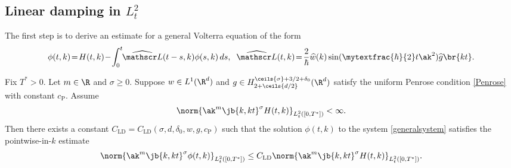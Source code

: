 \subsection{Linear damping in $L^2_t$} The first step is to derive an estimate for a general Volterra equation of the form
\begin{align}\label{generalsystem}
\phi(t,k)\!=\!H(t,k)\!-\!\int_0^t\hspace*{-1mm}\widehat {\mathscr L}(t-s,k)\phi(s,k)\,ds,\;\; \widehat {\mathscr L}(t,k)\!=\!\frac{2}{\hbar}\widehat w(k)\sin (\mytextfrac{\hbar}{2} t\ak^2)\widehat g\br{kt}.
\end{align}
\begin{proposition}\label{linearquantumdampingproposition}
Fix $T^*>0$.
Let $m\in\R$ and $\sigma\geq0$. Suppose $w\in L^1(\R^d)$ and $g\in H^{\ceils{\sigma}+3/2+\delta_0}_{2+\ceils{d/2}}(\R^d)$ satisfy the uniform Penrose condition \eqref{Penrose} with constant ${c_{\mathrm{P}}}$. Assume
\begin{align*}
\norm{\ak^m\jb{k,kt}^\sigma H(t,k)}_{L^2_{t}([0,T^*])}<\infty.
\end{align*}
Then there exists a constant $C_{\mathrm{LD}}=C_{\mathrm{LD}}(\sigma,d,\delta_0,w,g,{c_{\mathrm{P}}})$ such that the solution $\phi(t,k)$ to the system \eqref{generalsystem} satisfies the pointwise-in-$k$ estimate
\begin{align*}
\norm{\ak^m\jb{k,kt}^\sigma\phi(t,k)}_{L^2_{t}([0,T^*])}\leq C_{\mathrm{LD}}\norm{\ak^m\jb{k,kt}^\sigma H(t,k)}_{L^2_t([0,T^*])}.
\end{align*}
\end{proposition}
